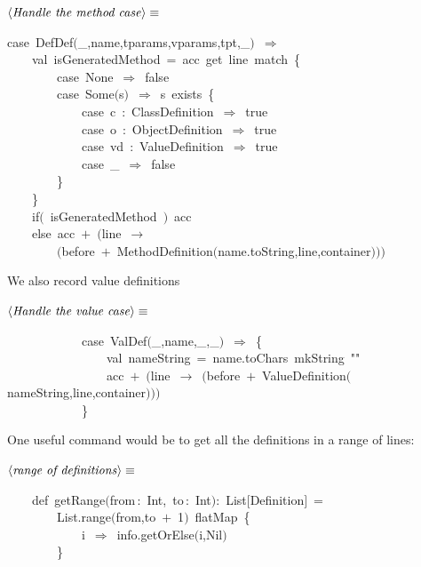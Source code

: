 \documentclass[a4paper,12pt]{article}
\begin{document}
$\left<\mbox{\emph{Handle the method case}}\right>\equiv$
\begin{program}{\vem case}~DefDef$($\_,name,tparams,vparams,tpt,\_$)$~$\Rightarrow$
\\~~~~{\vem val}~isGeneratedMethod~=~acc~get~line~{\vem match}~{\small\{}
\\~~~~~~~~{\vem case}~None~$\Rightarrow$~{\vem false}
\\~~~~~~~~{\vem case}~Some$($s$)$~$\Rightarrow$~s~exists~{\small\{}
\\~~~~~~~~~~~~{\vem case}~c~{\rm :}~ClassDefinition~$\Rightarrow$~{\vem true}
\\~~~~~~~~~~~~{\vem case}~o~{\rm :}~ObjectDefinition~$\Rightarrow$~{\vem true}
\\~~~~~~~~~~~~{\vem case}~vd~{\rm :}~ValueDefinition~$\Rightarrow$~{\vem true}
\\~~~~~~~~~~~~{\vem case}~\_~$\Rightarrow$~{\vem false}
\\~~~~~~~~{\small\}}
\\~~~~{\small\}}
\\~~~~{\vem if}$($~isGeneratedMethod~$)$~acc
\\~~~~{\vem else}~acc~$+$~$($line~$\rightarrow$
\\~~~~~~~~$($before~$+$~MethodDefinition$($name.toString,line,container$)$$)$$)$
\\[0.5em]\end{program}


We also record value definitions

$\left<\mbox{\emph{Handle the value case}}\right>\equiv$
\begin{program}~~~~~~~~~~~~{\vem case}~ValDef$($\_,name,\_,\_$)$~$\Rightarrow$~{\small\{}
\\~~~~~~~~~~~~~~~~{\vem val}~nameString~=~name.toChars~mkString~""
\\~~~~~~~~~~~~~~~~acc~$+$~$($line~$\rightarrow$~$($before~$+$~ValueDefinition$($nameString,line,container$)$$)$$)$~
\\~~~~~~~~~~~~{\small\}}
\\[0.5em]\end{program}


 One useful
command would be to get all the definitions in a range of lines:

$\left<\mbox{\emph{range of definitions}}\right>\equiv$
\begin{program}~~~~{\vem def}~getRange$($from\,{\rm :}~Int,~to\,{\rm :}~Int$)${\rm :}~List$[$Definition$]$~=
\\~~~~~~~~List.range$($from,to~$+$~1$)$~flatMap~{\small\{}
\\~~~~~~~~~~~~i~$\Rightarrow$~info.getOrElse$($i,Nil$)$
\\~~~~~~~~{\small\}}
\\[0.5em]\end{program}
\end{document}

